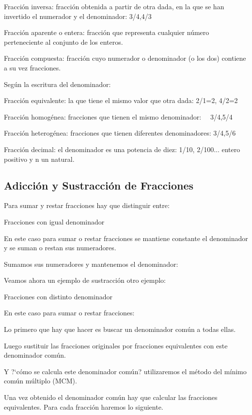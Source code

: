 \documentclass{article}
\begin{document}
Fracci\'on inversa: fracci\'on obtenida a partir de otra dada, en la que se han invertido el numerador y el denominador: 3/4,4/3

Fracci\'on aparente o entera: fracci\'on que representa cualquier n\'umero perteneciente al conjunto de los enteros.

Fracci\'on compuesta: fracci\'on cuyo numerador o denominador (o los dos) contiene a su vez fracciones.

Seg\'un la escritura del denominador:

Fracci\'on equivalente: la que tiene el mismo valor que otra dada: 2/1=2, 4/2=2

Fracci\'on homog\'enea: fracciones que tienen el mismo denominador: \ \ 3/4,5/4

Fracci\'on heterog\'enea: fracciones que tienen diferentes denominadores: 3/4,5/6

Fracci\'on decimal: el denominador es una potencia de diez: 1/10, 2/100... entero positivo y n un natural.

\subsection[Adicci\'on y Sustracci\'on de Fracciones]{Adicci\'on y Sustracci\'on de Fracciones}

\bigskip

Para sumar y restar fracciones hay que distinguir entre:

Fracciones con igual denominador

En este caso para sumar o restar fracciones se mantiene constante el denominador y se suman o restan sus numeradores.

Sumamos sus numeradores y mantenemos el denominador:

Veamos ahora un ejemplo de sustracci\'on otro ejemplo:

Fracciones con distinto denominador

En este caso para sumar o restar fracciones:

Lo primero que hay que hacer es buscar un denominador com\'un a todas ellas.

Luego sustituir las fracciones originales por fracciones equivalentes con este denominador com\'un.

Y ?`c\'omo se calcula este denominador com\'un? utilizaremos el m\'etodo del m\'inimo com\'un m\'ultiplo (MCM).

Una vez obtenido el denominador com\'un hay que calcular las fracciones equivalentes. Para cada fracci\'on haremos lo siguiente.
\end{document}
